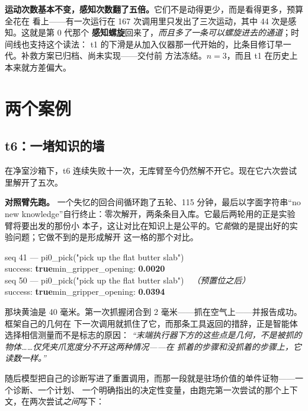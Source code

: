 \documentclass[11pt,a4paper,UTF8,fontset=macnew]{ctexrep}
\newcommand{\keyrule}[1]{\textbf{\textcolor{acc}{#1}}}
\begin{document}
\noindent
\textbf{运动次数基本不变，感知次数翻了五倍。}它们不是动得更少，而是看得更多，预算全花在
看上——有一次运行在 167 次调用里只发出了三次运动，其中 44 次是感知。这就是第 0 代那个
\textbf{感知螺旋}回来了，\emph{而且多了一条可以螺旋进去的通道}；时间线也支持这个读法：
t1 的下滑是从加入仪器那一代开始的，比条目修订早一代。补救方案已归档、尚未实现——交付前
方法冻结。$n=3$，而且 t1 在历史上本来就方差偏大。

\chapter{两个案例}

\section{t6：一堵知识的墙}

在净室沙箱下，t6 连续失败十一次，无库臂至今仍然解不开它。现在它六次尝试里解开了五次。

\keyrule{对照臂先跑。} 一个失忆的回合间循环跑了五轮、115 分钟，最后以字面字符串“no new
knowledge”自行终止：零次解开，两条条目入库。它最后两轮用的正是实验臂将要出发的那份小
本子，这让对比在知识上是公平的。它\emph{能}做的是提出好的实验问题；它做不到的是形成解开
这一格的那个对比。

\begin{evidence}[title={判别式：同一句提示、同一格，中间只差一次移动}]
\ttfamily\footnotesize
seq 41 --- pi0\_pick("pick up the flat butter slab")\\
\hspace*{2em}success: \textbf{true}\quad min\_gripper\_opening: \textbf{0.0020}\\[0.4em]
seq 50 --- pi0\_pick("pick up the flat butter slab")\ \ \textrm{\emph{（预置位之后）}}\\
\hspace*{2em}success: \textbf{true}\quad min\_gripper\_opening: \textbf{0.0394}
\end{evidence}

\noindent
那块黄油是 40 毫米。第一次抓握闭合到 2 毫米——抓在空气上——并报告成功。框架自己的几何在
下一次调用就抓住了它，而那条工具返回的措辞，正是智能体选择相信测量而不是标志的原因：
\emph{“末端执行器下方的这些点是几何，不是被抓的物体……仅凭夹爪宽度分不开这两种情况——在
抓着的步骤和没抓着的步骤上，它读数一样。”}

随后模型把自己的诊断写进了重置调用，而那一段就是驻场价值的单件证物——一个诊断、一个计划、
一个明确指出的决定性变量，由跑完第一次尝试的那个上下文，在两次尝试\emph{之间}写下：
\end{document}
